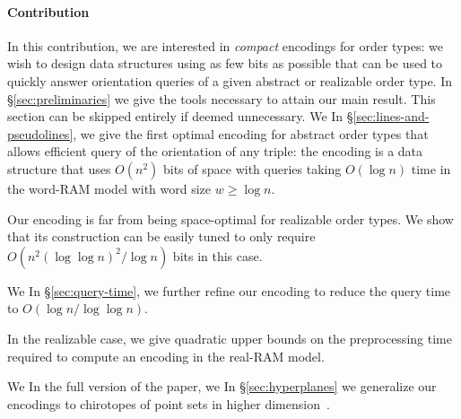 


\paragraph{Contribution}

In this contribution, we are interested in \emph{compact} encodings for
order types: we wish to design data structures using as few bits as possible
that can be used to quickly answer orientation queries of a given abstract or
realizable order type.
\ifeurocg%
\DefinitionEncoding*
\fi%
%
\ifjournal%
	In \S\ref{sec:preliminaries} we give the tools necessary to
	attain our main result. This section can be skipped entirely if deemed
	unnecessary.
\fi%
\ifeurocg%
We \else%
In \S\ref{sec:lines-and-pseudolines}, we \fi%
give the first optimal encoding for abstract
order types that allows efficient query of the orientation of any triple: the
encoding is a data structure that uses \( O(n^2) \) bits of space with queries
taking \(O(\log n)\) time in the word-RAM model with word size \(w \geq \log
n\).
\ifeurocg%

\fi%
%
Our encoding is far from being space-optimal for realizable order types.
We show that its construction can be easily tuned to only require \(O(n^2
{(\log{\log{n}})}^2 / \log{n})\) bits in this case.
\ifeurocg%

\fi%
%
\ifeurocg%
We \else%
In \S\ref{sec:query-time}, we \fi%
further refine our encoding to
reduce the query time to \(O(\log{n}/\log{\log{n}})\).
\ifeurocg%


\fi%
%
In the realizable case, we give quadratic upper bounds on the
preprocessing time required to compute an encoding in the real-RAM model.
\ifeurocg%

\fi%
%
\ifeurocg%
We \else\ifsocg%
In the full version of the paper, we \else%
In \S\ref{sec:hyperplanes} we \fi\fi%
generalize our encodings to chirotopes of
point sets in higher dimension\ifsocg~\cite{CCILO18}\fi.
\ifeurocg%

\fi%
\ifeurocg%

\fi%
